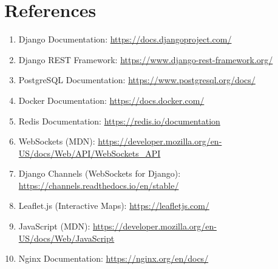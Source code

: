 \documentclass[conference]{IEEEtran}
\begin{document}
\section*{References}
\begin{enumerate}
    \item Django Documentation: \url{https://docs.djangoproject.com/}
    \item Django REST Framework: \url{https://www.django-rest-framework.org/}
    \item PostgreSQL Documentation: \url{https://www.postgresql.org/docs/}
    \item Docker Documentation: \url{https://docs.docker.com/}
    \item Redis Documentation: \url{https://redis.io/documentation}
    \item WebSockets (MDN): \url{https://developer.mozilla.org/en-US/docs/Web/API/WebSockets_API}
    \item Django Channels (WebSockets for Django): \url{https://channels.readthedocs.io/en/stable/}
    \item Leaflet.js (Interactive Maps): \url{https://leafletjs.com/}
    \item JavaScript (MDN): \url{https://developer.mozilla.org/en-US/docs/Web/JavaScript}
    \item Nginx Documentation: \url{https://nginx.org/en/docs/}
\end{enumerate}
\end{document}

